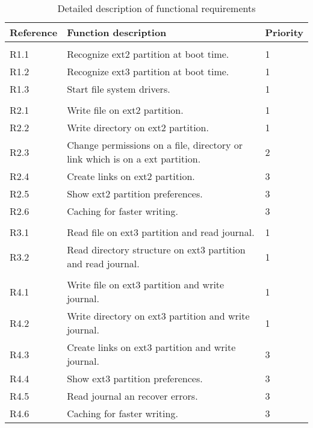 \begin{longtable}{p{2cm} X p{2cm}}
\caption{\label{tab:tabFunctions}Detailed description of functional requirements }\\
\textbf{Reference}	& \textbf{Function description}					&\textbf{Priority}\\
\hline
&&\\
R1.1 				&Recognize ext2 partition at boot time.														&1\\
R1.2				&Recognize ext3 partition at boot time.														&1\\
R1.3				&Start file system drivers.																				&1\\

&&\\
R2.1				&Write file on ext2 partition.																		&1\\
R2.2				&Write directory on ext2 partition.																&1\\
R2.3				&Change permissions on a file, directory or link which is on a ext partition.	&2\\
R2.4				&Create links on ext2 partition.																	&3\\
R2.5				&Show ext2 partition preferences.																	&3\\
R2.6				&Caching for faster writing.																			&3\\

&&\\
R3.1				&Read file on ext3 partition and read journal.										&1\\
R3.2				&Read directory structure on ext3 partition and read journal.			&1\\

&&\\
R4.1				&Write file on ext3 partition and write journal.									&1\\
R4.2				&Write directory on ext3 partition and write journal.							&1\\
R4.3				&Create links on ext3 partition and write journal.								&3\\
R4.4				&Show ext3 partition preferences.																	&3\\
R4.5				&Read journal an recover errors.																	&3\\
R4.6				&Caching for faster writing.																			&3\\

\end{longtable}
